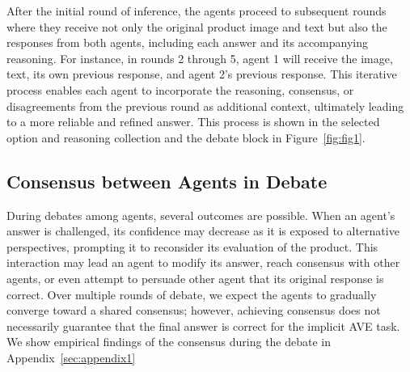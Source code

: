\documentclass[11pt]{article}
\begin{document}
After the initial round of inference, the agents proceed to subsequent rounds where they receive not only the original product image and text but also the responses from both agents, including each answer and its accompanying reasoning. For instance, in rounds 2 through 5, agent 1 will receive the image, text, its own previous response, and agent 2’s previous response. This iterative process enables each agent to incorporate the reasoning, consensus, or disagreements from the previous round as additional context, ultimately leading to a more reliable and refined answer. This process is shown in the selected option and reasoning collection and the debate block in Figure~\ref{fig:fig1}.


\subsection{Consensus between Agents in Debate}
\label{sec:Consensus between Agents in Debate}

During debates among agents, several outcomes are possible. When an agent’s answer is challenged, its confidence may decrease as it is exposed to alternative perspectives, prompting it to reconsider its evaluation of the product. This interaction may lead an agent to modify its answer, reach consensus with other agents, or even attempt to persuade other agent that its original response is correct. Over multiple rounds of debate, we expect the agents to gradually converge toward a shared consensus; however, achieving consensus does not necessarily guarantee that the final answer is correct for the implicit AVE task. We show empirical findings of the consensus during the debate in Appendix~\ref{sec:appendix1}
\end{document}
